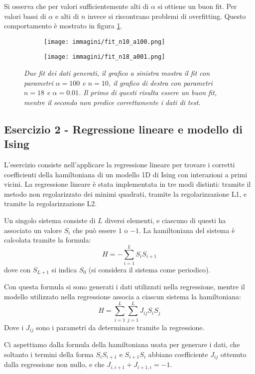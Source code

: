\documentclass{article}
\begin{document}
Si osserva che per valori sufficientemente alti di $\alpha$ si ottiene un buon fit. Per valori bassi di $\alpha$ e alti di $n$ invece si riscontrano problemi di overfitting.
Questo comportamento è mostrato in figura \ref{fig:fits_ex1}.


\begin{figure}[H]
    \centering
    \begin{subfigure}{.49\textwidth}
        \centering
        \texttt{[image: immagini/fit\_n10\_a100.png]}
     \end{subfigure}
     \begin{subfigure}{.49\textwidth}
        \centering
        \texttt{[image: immagini/fit\_n18\_a001.png]}
     \end{subfigure}
    \caption{\emph{Due fit dei dati generati, il grafico a sinistra mostra il fit con parametri $\alpha = 100$ e $n = 10$, il grafico di destra con parametri $n = 18$ e $\alpha = 0.01$. Il primo di questi risulta essere un buon fit, mentre il secondo non predice correttamente i dati di test.}}
    \label{fig:fits_ex1}
\end{figure}

\subsection*{Esercizio 2 - Regressione lineare e modello di Ising}
L'esercizio consiste nell'applicare la regressione lineare per trovare i corretti coefficienti della hamiltoniana di un modello 1D di Ising con interazioni a primi vicini.
La regressione lineare è stata implementata in tre modi distinti: tramite il metodo non regolarizzato dei minimi quadrati, tramite la regolarizzazione L1, e tramite la regolarizzazione L2.

Un singolo sistema consiste di $L$ diversi elementi,
e ciascuno di questi ha associato un valore $S_i$ che può essere $1$ o $-1$.
La hamiltoniana del sistema è calcolata tramite la formula:
\[
H = - \sum_{i=1}^L S_i S_{i+1}
\]
dove con $S_{L+1}$ si indica $S_0$ (si considera il sistema come periodico).

Con questa formula si sono generati i dati utilizzati nella regressione,
mentre il modello utilizzato nella regressione associa a ciascun sistema la hamiltoniana:
\[
H =  \sum_{i=1}^{L}\sum_{j=1}^{L} J_{ij} S_i S_j
\]
Dove i $J_{ij}$ sono i parametri da determinare tramite la regressione.

Ci aspettiamo dalla formula della hamiltoniana usata per generare i dati, che soltanto i termini della forma $S_i S_{i+1}$ e $S_{i+1} S_{i}$ abbiano coefficiente $J_{ij}$ ottenuto dalla regressione non nullo,
e che $J_{i,i+1} + J_{i+1, i} = -1$.
\end{document}
